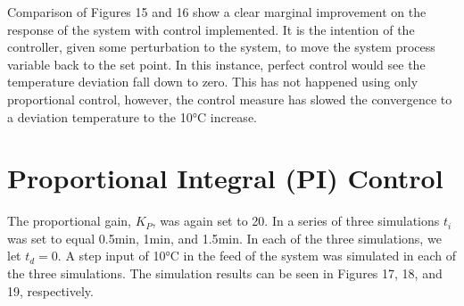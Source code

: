 \documentclass{article}
\begin{document}
Comparison of Figures 15 and 16 show a clear marginal improvement on the response of the system with control implemented. It is the intention of the controller, given some perturbation to the system, to move the system process variable back to the set point. In this instance, perfect control would see the temperature deviation fall down to zero. This has not happened using only proportional control, however, the control measure has slowed the convergence to a deviation temperature to the 10$\si{\degreeCelsius}$ increase. 
\newpage

\section{Proportional Integral (PI) Control}
The proportional gain, $K_P$, was again set to 20. In a series of three simulations $t_i$ was set to equal 0.5$\si{\minute}$, 1$\si{\minute}$, and 1.5$\si{\minute}$. In each of the three simulations, we let $t_d = 0$. A step input of 10$\si{\degreeCelsius}$ in the feed of the system was simulated in each of the three simulations. The simulation results can be seen in Figures 17, 18, and 19, respectively.
\end{document}
